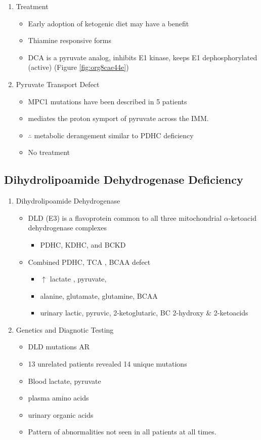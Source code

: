 \documentclass{scrartcl}
\begin{document}
\begin{enumerate}
\item Treatment
\label{sec:org23627b0}
\begin{itemize}
\item Early adoption of ketogenic diet may have a benefit
\item Thiamine responsive forms
\item DCA is a pyruvate analog, inhibits E1 kinase, keeps E1 dephosphorylated (active) (Figure \ref{fig:org8cae44e})
\end{itemize}

\item Pyruvate Transport Defect
\label{sec:orgc8c2b33}
\begin{itemize}
\item MPC1 mutations have been described in 5 patients
\item mediates the proton symport of pyruvate across the IMM.
\item \(\therefore\) metabolic derangement similar to PDHC deficiency
\item No treatment
\end{itemize}
\end{enumerate}

\subsection{Dihydrolipoamide Dehydrogenase Deficiency}
\label{sec:org86c2322}
\begin{enumerate}
\item Dihydrolipoamide Dehydrogenase
\label{sec:org6d2888f}
\begin{itemize}
\item DLD (E3) is a flavoprotein common to all three mitochondrial
\(\alpha\)-ketoacid dehydrogenase complexes
\begin{itemize}
\item PDHC, KDHC, and BCKD
\end{itemize}
\item Combined PDHC, TCA , BCAA defect
\begin{itemize}
\item \(\uparrow\) lactate , pyruvate,
\item alanine, glutamate, glutamine, BCAA
\item urinary lactic, pyruvic, 2-ketoglutaric, BC 2-hydroxy \& 2-ketoacids
\end{itemize}
\end{itemize}

\item Genetics and Diagnotic Testing
\label{sec:org2316e66}
\begin{itemize}
\item DLD mutations AR
\item 13 unrelated patients revealed 14 unique mutations
\item Blood lactate, pyruvate
\item plasma amino acids
\item urinary organic acids
\item Pattern of abnormalities not seen in all patients at all times.
\end{itemize}
\end{enumerate}
\end{document}
